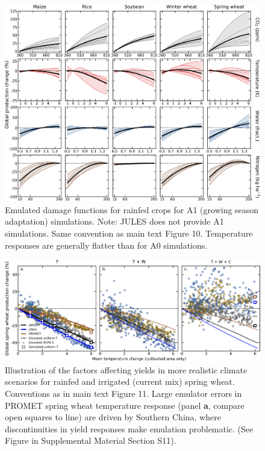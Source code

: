 \documentclass[12pt]{article}
\begin{document}
\begin{figure}[h!]
  \centering
  \includegraphics[width = 16.3cm]{em_CTWN_all_crops_A1.png}
  \caption{
  Emulated damage functions for rainfed crops for A1 (growing season adaptation) simulations. Note: JULES does not provide A1 simulations. Same convention as main text Figure 10.
  Temperature responses are generally flatter than for A0 simulations.
  }
  \label{fig:all_dims}
\end{figure}

\clearpage

\begin{figure}[h!]
  \centering
  \includegraphics[width = 16.3cm]{LPJmL_pDSSAT_PROMET_RCP85_all_cases_spring_wheat.png}
  \caption{
	  Illustration of the factors affecting yields in more realistic climate scenarios for rainfed and irrigated (current mix) spring wheat. Conventions as in  main text Figure 11. Large emulator errors in PROMET spring wheat temperature response (panel \textbf{a}, compare open squares to line) are driven by Southern China, where discontinuities in yield responses make emulation problematic. (See Figure in Supplemental Material Section S11).
	  }
\end{figure}
\end{document}
